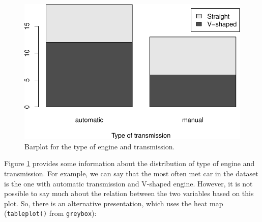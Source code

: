 \documentclass[
]{book}
\newenvironment{Shaded}{\begin{snugshade}}{\end{snugshade}}
\newcommand{\AttributeTok}[1]{\textcolor[rgb]{0.13,0.29,0.53}{#1}}
\newcommand{\FunctionTok}[1]{\textcolor[rgb]{0.13,0.29,0.53}{\textbf{#1}}}
\newcommand{\NormalTok}[1]{#1}
\newcommand{\SpecialCharTok}[1]{\textcolor[rgb]{0.81,0.36,0.00}{\textbf{#1}}}
\newcommand{\StringTok}[1]{\textcolor[rgb]{0.31,0.60,0.02}{#1}}
\theoremstyle{definition}
\theoremstyle{definition}
\theoremstyle{definition}
\theoremstyle{definition}
\theoremstyle{remark}
\begin{document}
\begin{Shaded}
\end{Shaded}

\begin{figure}
\centering
\includegraphics{Svetunkov---Statistics-for-Business-Analytics_files/figure-latex/barplotVSAM-1.pdf}
\caption{\label{fig:barplotVSAM}Barplot for the type of engine and transmission.}
\end{figure}

Figure \ref{fig:barplotVSAM} provides some information about the distribution of type of engine and transmission. For example, we can say that the most often met car in the dataset is the one with automatic transmission and V-shaped engine. However, it is not possible to say much about the relation between the two variables based on this plot. So, there is an alternative presentation, which uses the heat map (\texttt{tableplot()} from \texttt{greybox}):

\begin{Shaded}
\end{Shaded}
\end{document}
